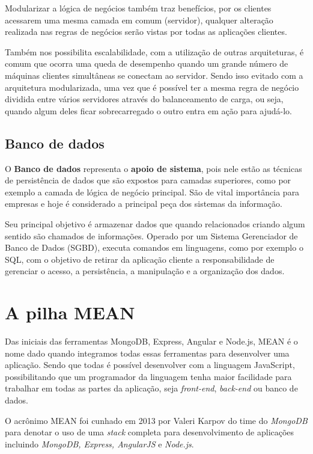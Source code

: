 \documentclass[
	12pt,				%
	openright,			%
	twoside,			%
	a4paper,			%
	english,			%
	brazil				%
	]{abntex2}
\begin{document}
Modularizar a lógica de negócios também traz benefícios, por os clientes acessarem uma mesma camada em comum (servidor), qualquer alteração realizada nas regras de negócios serão vistas por todas as aplicações clientes.

Também nos possibilita escalabilidade, com a utilização de outras arquiteturas, é comum que ocorra uma queda de desempenho quando um grande número de máquinas clientes simultâneas se conectam ao servidor. Sendo isso evitado com a arquitetura modularizada, uma vez que é possível ter a mesma regra de negócio dividida entre vários servidores através do balanceamento de carga, ou seja, quando algum deles ficar sobrecarregado o outro entra em ação para ajudá-lo. 

\subsection{Banco de dados}
\label{subsec:BancoDeDados}

O \textbf{Banco de dados} representa o \textbf{apoio de sistema}, pois nele estão as técnicas de persistência de dados que são expostos para camadas superiores, como por exemplo a camada de lógica de negócio principal. São de vital importância para empresas e hoje é considerado a principal peça dos sistemas da informação.

Seu principal objetivo é armazenar dados que quando relacionados criando algum sentido são chamados de informações. Operado por um Sistema Gerenciador de Banco de Dados (SGBD), executa comandos em linguagens, como por exemplo o SQL, com o objetivo de retirar da aplicação cliente a responsabilidade de gerenciar o acesso, a persistência, a manipulação e a organização dos dados.

\section{A pilha MEAN}

Das iniciais das ferramentas MongoDB, Express, Angular e Node.js, MEAN é o nome dado quando integramos todas essas ferramentas para desenvolver uma aplicação. Sendo que todas é possível desenvolver com a linguagem JavaScript, possibilitando que um programador da linguagem tenha maior facilidade para trabalhar em todas as partes da aplicação, seja \textit{front-end}, \textit{back-end} ou banco de dados.

O acrônimo MEAN foi cunhado em 2013 por Valeri Karpov do time do \textit{MongoDB} \cite{karpov_mean} para denotar o uso de uma \textit{stack} completa para desenvolvimento de aplicações incluindo \textit{MongoDB, Express, AngularJS} e \textit{Node.js}.
\end{document}
